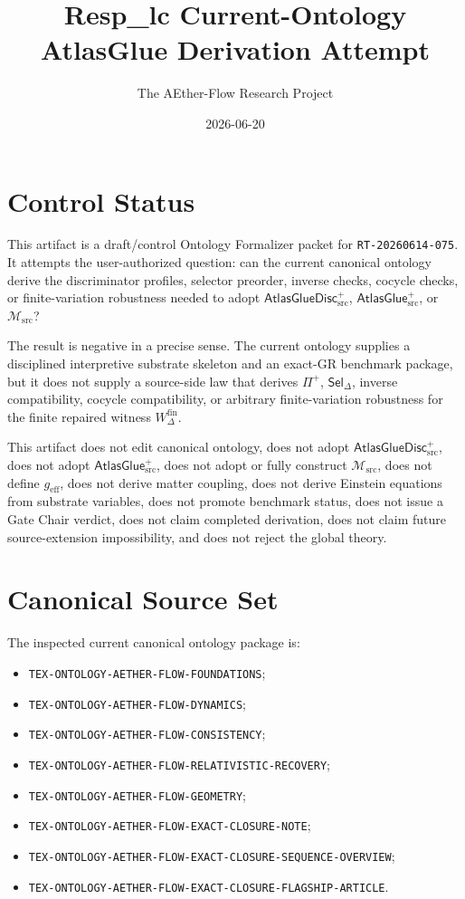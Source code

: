 \documentclass[11pt]{article}
\title{Resp\_lc Current-Ontology AtlasGlue Derivation Attempt}
\author{The AEther-Flow Research Project}
\date{2026-06-20}
\newcommand{\Msrc}{\mathcal{M}_{\mathrm{src}}}
\newcommand{\geff}{g_{\mathrm{eff}}}
\newcommand{\AtlasGlue}{\mathsf{AtlasGlue}_{\mathrm{src}}^{+}}
\newcommand{\AtlasGlueDisc}{\mathsf{AtlasGlueDisc}_{\mathrm{src}}^{+}}
\newcommand{\Prof}{\Pi^{+}}
\newcommand{\Sel}{\mathsf{Sel}_{\Delta}}
\newcommand{\Wfin}{W_{\Delta}^{\mathrm{fin}}}
\begin{document}
\maketitle

\section*{Control Status}

This artifact is a draft/control Ontology Formalizer packet for
\texttt{RT-20260614-075}. It attempts the user-authorized question:
can the current canonical ontology derive the discriminator profiles,
selector preorder, inverse checks, cocycle checks, or finite-variation
robustness needed to adopt \(\AtlasGlueDisc\), \(\AtlasGlue\), or \(\Msrc\)?

The result is negative in a precise sense. The current ontology supplies a
disciplined interpretive substrate skeleton and an exact-GR benchmark package,
but it does not supply a source-side law that derives \(\Prof\), \(\Sel\),
inverse compatibility, cocycle compatibility, or arbitrary finite-variation
robustness for the finite repaired witness \(\Wfin\).

This artifact does not edit canonical ontology, does not adopt
\(\AtlasGlueDisc\), does not adopt \(\AtlasGlue\), does not adopt or fully
construct \(\Msrc\), does not define \(\geff\), does not derive matter
coupling, does not derive Einstein equations from substrate variables, does
not promote benchmark status, does not issue a Gate Chair verdict, does not
claim completed derivation, does not claim future source-extension
impossibility, and does not reject the global theory.

\section{Canonical Source Set}

The inspected current canonical ontology package is:
\begin{itemize}
  \item \texttt{TEX-ONTOLOGY-AETHER-FLOW-FOUNDATIONS};
  \item \texttt{TEX-ONTOLOGY-AETHER-FLOW-DYNAMICS};
  \item \texttt{TEX-ONTOLOGY-AETHER-FLOW-CONSISTENCY};
  \item \texttt{TEX-ONTOLOGY-AETHER-FLOW-RELATIVISTIC-RECOVERY};
  \item \texttt{TEX-ONTOLOGY-AETHER-FLOW-GEOMETRY};
  \item \texttt{TEX-ONTOLOGY-AETHER-FLOW-EXACT-CLOSURE-NOTE};
  \item \texttt{TEX-ONTOLOGY-AETHER-FLOW-EXACT-CLOSURE-SEQUENCE-OVERVIEW};
  \item \texttt{TEX-ONTOLOGY-AETHER-FLOW-EXACT-CLOSURE-FLAGSHIP-ARTICLE}.
\end{itemize}
\end{document}
